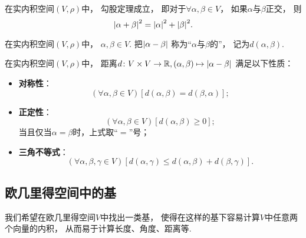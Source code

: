 \begin{corollary}
在实内积空间\((V,\rho)\)中，
勾股定理成立，
即对于\(\forall \alpha,\beta \in V\)，
如果\(\alpha\)与\(\beta\)正交，
则\begin{equation}
	\abs{\alpha+\beta}^2 = \abs{\alpha}^2 + \abs{\beta}^2.
\end{equation}
\end{corollary}

\begin{definition}
在实内积空间\((V,\rho)\)中，
\(\alpha,\beta \in V\).
把\(\abs{\alpha-\beta}\)
称为“\(\alpha\)与\(\beta\)的”，
记为\(d(\alpha,\beta)\).
\end{definition}

\begin{property}
在实内积空间\((V,\rho)\)中，
距离\(d\colon V \times V \to \mathbb{R},
(\alpha,\beta) \mapsto \abs{\alpha-\beta}\)
满足以下性质：\begin{itemize}
	\item {\rm\bf 对称性}：\begin{equation*}
		(\forall \alpha,\beta \in V)
		[
			d(\alpha,\beta) = d(\beta,\alpha)
		];
	\end{equation*}

	\item {\rm\bf 正定性}：\begin{equation*}
		(\forall \alpha,\beta \in V)
		[
			d(\alpha,\beta) \geq 0
		];
	\end{equation*}
	当且仅当\(\alpha = \beta\)时，上式取“\(=\)”号；

	\item {\rm\bf 三角不等式}：\begin{equation*}
		(\forall \alpha,\beta,\gamma \in V)
		[
			d(\alpha,\gamma) \leq d(\alpha,\beta) + d(\beta,\gamma)
		].
	\end{equation*}
\end{itemize}
\end{property}

\subsection{欧几里得空间中的基}
我们希望在欧几里得空间\(V\)中找出一类基，
使得在这样的基下容易计算\(V\)中任意两个向量的内积，
从而易于计算长度、角度、距离等.

